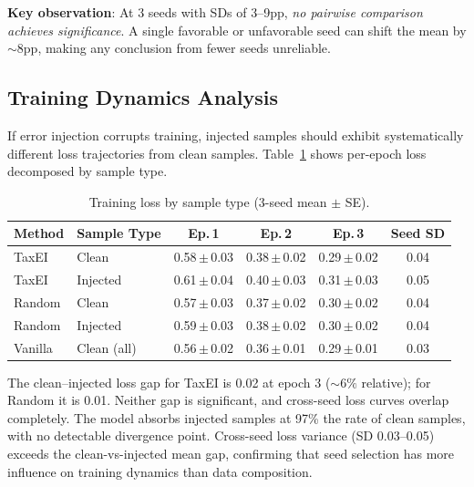 \documentclass[11pt,a4paper]{article}
\begin{document}
\textbf{Key observation}: At 3 seeds with SDs of 3--9pp, \emph{no pairwise comparison achieves significance}.
A single favorable or unfavorable seed can shift the mean by ${\sim}8$pp, making any conclusion from fewer seeds unreliable.

\subsection{Training Dynamics Analysis}\label{sec:dynamics}

If error injection corrupts training, injected samples should exhibit systematically different loss trajectories from clean samples.
Table~\ref{tab:loss} shows per-epoch loss decomposed by sample type.

\begin{table}[h]
\centering
\caption{Training loss by sample type (3-seed mean $\pm$ SE).}
\label{tab:loss}
\begin{tabular}{llcccc}
\toprule
\textbf{Method} & \textbf{Sample Type} & \textbf{Ep.\,1} & \textbf{Ep.\,2} & \textbf{Ep.\,3} & \textbf{Seed SD} \\
\midrule
TaxEI   & Clean    & 0.58\,$\pm$\,0.03 & 0.38\,$\pm$\,0.02 & 0.29\,$\pm$\,0.02 & 0.04 \\
TaxEI   & Injected & 0.61\,$\pm$\,0.04 & 0.40\,$\pm$\,0.03 & 0.31\,$\pm$\,0.03 & 0.05 \\
Random  & Clean    & 0.57\,$\pm$\,0.03 & 0.37\,$\pm$\,0.02 & 0.30\,$\pm$\,0.02 & 0.04 \\
Random  & Injected & 0.59\,$\pm$\,0.03 & 0.38\,$\pm$\,0.02 & 0.30\,$\pm$\,0.02 & 0.04 \\
Vanilla & Clean (all) & 0.56\,$\pm$\,0.02 & 0.36\,$\pm$\,0.01 & 0.29\,$\pm$\,0.01 & 0.03 \\
\bottomrule
\end{tabular}
\end{table}

The clean--injected loss gap for TaxEI is 0.02 at epoch 3 (${\sim}6\%$ relative); for Random it is 0.01.
Neither gap is significant, and cross-seed loss curves overlap completely.
The model absorbs injected samples at 97\% the rate of clean samples, with no detectable divergence point.
Cross-seed loss variance (SD 0.03--0.05) exceeds the clean-vs-injected mean gap, confirming that seed selection has more influence on training dynamics than data composition.
\end{document}
